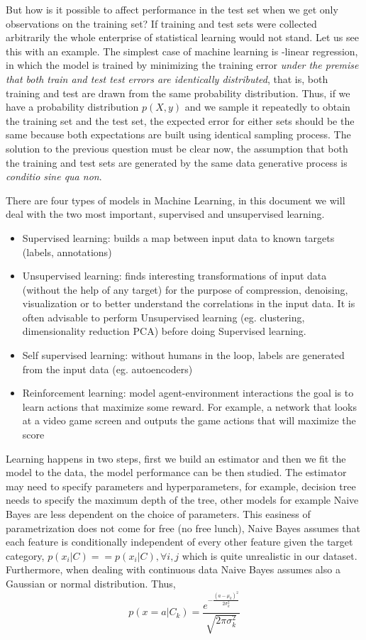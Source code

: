 \documentclass[11pt]{article}
\theoremstyle{definition}
\theoremstyle{remark}
\begin{document}
{But how is it possible to affect performance in the test set when we get only observations on the training set? If training and test sets were collected arbitrarily the whole enterprise of statistical learning would not stand. 
Let us see this with an example. The simplest case of machine learning is -linear regression, in which the model is trained by minimizing the training error \emph{under the premise that both train and test test errors are identically distributed}, that is, both training and test are drawn from the same probability distribution. Thus, if we have a probability distribution $p(X,y)$ and we sample it repeatedly to obtain the training set and the test set, the expected error for either sets should be the same because both expectations are built using identical sampling process.
The solution to the previous question must be clear now, the assumption that both the training and test sets are generated by the same data generative process is \emph{conditio sine qua non}.


There are four types of models in Machine Learning, in this document we will deal with the two most important, supervised and unsupervised learning.  
\begin{itemize}
\item Supervised learning: builds a map between input data to known targets (labels, annotations) 
\item Unsupervised learning: finds interesting transformations of input data (without the help of any target) for the purpose of compression, denoising, visualization or to better understand the correlations in the input data. 
It is often advisable to perform Unsupervised learning (eg. clustering, dimensionality reduction PCA) before doing Supervised learning.
\item Self supervised learning: without humans in the loop, labels are generated from the input data (eg. autoencoders)
\item Reinforcement learning: model agent-environment interactions the goal is to learn actions that maximize some reward. For example, a network that looks at a video game screen and outputs the game actions that will maximize the score \cite{mnih2013playing}
\end{itemize}

Learning happens in two steps, first we build an estimator and then we fit the model to the data, the model performance can be then studied. The estimator may need to specify parameters and hyperparameters, for example, decision tree needs to specify the maximum depth of the tree, other models for example Naive Bayes are less dependent on the choice of parameters. 
This easiness of parametrization does not come for free (no free lunch), Naive Bayes assumes that each feature is conditionally independent of every other feature given the target category, $p(x_i|C) == p(x_i|C), \forall i,j$ which is quite unrealistic in our dataset. Furthermore, when dealing with continuous data Naive Bayes assumes also a Gaussian or normal distribution. Thus, 
\begin{equation}
p(x = a|C_k) = \frac{e^{-\frac{(a-\mu_k)^2}{2\sigma_k^{2}}}} {\sqrt{2\pi\sigma_k^{2}}}
\label{eq:gauss}
\end{equation}

}
\end{document}
